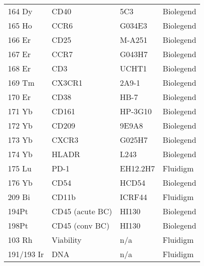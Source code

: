 \begin{flushleft}
\begin{longtable}[c]{l l l l}
    164 Dy & CD40 & 5C3 & Biolegend \\
    165 Ho & CCR6 & G034E3 & Biolegend \\
    166 Er & CD25 & M-A251 & Biolegend \\
    167 Er & CCR7 & G043H7 & Biolegend \\
    168 Er & CD3 & UCHT1 & Biolegend \\
    169 Tm & CX3CR1 & 2A9-1 & Biolegend \\
    170 Er & CD38 & HB-7 & Biolegend \\
    171 Yb & CD161 & HP-3G10 & Biolegend \\
    172 Yb & CD209 & 9E9A8 & Biolegend \\
    173 Yb & CXCR3 & G025H7 & Biolegend \\
    174 Yb & HLADR & L243 & Biolegend \\
    175 Lu & PD-1 & EH12.2H7 & Fluidigm \\
    176 Yb & CD54 & HCD54 & Biolegend \\
    209 Bi & CD11b & ICRF44 & Fluidigm \\
    194Pt & CD45 (acute BC) & HI130 & Biolegend \\
    198Pt  & CD45 (conv BC) & HI130 & Biolegend \\
    103 Rh  & Viability & n/a & Fluidigm \\
    191/193 Ir & DNA & n/a & Fluidigm
    \label{tab:chik_antibodies}
\end{longtable}

\end{flushleft}

\restoregeometry
\tuftefancyhfoffset

\clearpage
\newpage

